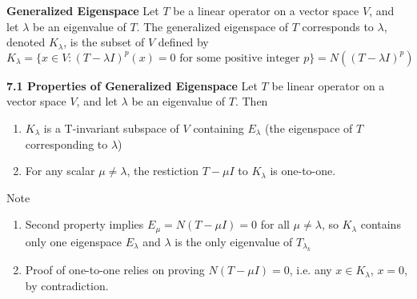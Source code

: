 \documentclass[11pt]{article}
\begin{document}
\begin{defn*}
    \textbf{Generalized Eigenspace} Let $T$ be a linear operator on a vector space $V$, and let $\lambda$ be an eigenvalue of $T$. The generalized eigenspace of $T$ corresponds to $\lambda$, denoted $K_{\lambda}$, is the subset of $V$ defined by 
    \[
        K_{\lambda} = 
        \{ x\in V: (T-\lambda I)^p(x) = 0 \text{ for some positive integer } p\} = 
        N((T-\lambda I)^p)
    \]
\end{defn*}


\begin{theorem*}
    \textbf{7.1 Properties of Generalized Eigenspace} Let $T$ be linear operator on a vector space $V$, and let $\lambda$ be an eigenvalue of $T$. Then 
    \begin{enumerate}
        \item $K_{\lambda}$ is a T-invariant subspace of $V$ containing $E_{\lambda}$ (the eigenspace of $T$ corresponding to $\lambda$)
        \item For any scalar $\mu \neq \lambda$, the restiction $T - \mu I$ to $K_{\lambda}$ is one-to-one.
    \end{enumerate}
    Note
    \begin{enumerate}
        \item Second property implies $E_{\mu} = N(T-\mu I) = 0$ for all $\mu \neq \lambda$, so $K_{\lambda}$ contains only one eigenspace $E_{\lambda}$ and $\lambda$ is the only eigenvalue of $T_{\lambda_k}$
        \item Proof of one-to-one relies on proving $N(T-\mu I) = 0$, i.e. any $x\in K_{\lambda}$, $x=0$, by contradiction.
    \end{enumerate}
\end{theorem*}
\end{document}
